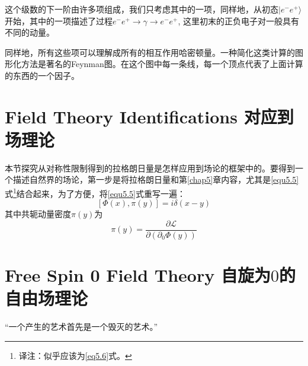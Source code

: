 这个级数的下一阶由许多项组成，我们只考虑其中的一项，同样地，从初态$|e^{-}e^{+} \rangle$开始，其中的一项描述了过程$e^{-}e^{+} \to \gamma \to e^{-}e^{+}$, 这里初末的正负电子对一般具有不同的动量。

同样地，所有这些项可以理解成所有的相互作用哈密顿量。一种简化这类计算的图形化方法是著名的Feynman图。在这个图中每一条线，每一个顶点代表了上面计算的东西的一个因子。

\section[对应到场理论]{Field Theory Identifications \quad 对应到场理论}
\label{sec9.1}
本节探究从对称性限制得到的拉格朗日量是怎样应用到场论的框架中的。要得到一个描述自然界的场论，第一步是将拉格朗日量和第\ref{chap5}章内容，尤其是\eqref{equ5.5}式\footnote{译注：似乎应该为\eqref{eq5.6}式。}结合起来，为了方便，将\eqref{equ5.5}式重写一遍：
\begin{equation}
\label{equ9.1}
    [\Phi(x), \pi(y)] = i\delta(x - y)
\end{equation}
其中共轭动量密度$\pi(y)$为
\begin{equation}
\label{equ9.2}
    \pi(y)=\frac{\partial \mathscr{L}}{\partial(\partial_{0}\Phi(y))}
\end{equation}
\section[自旋为$0$的自由场理论]{Free Spin 0 Field Theory \quad 自旋为$0$的自由场理论}
\label{sec9.2}
{\small “一个产生的艺术首先是一个毁灭的艺术。”\\}

